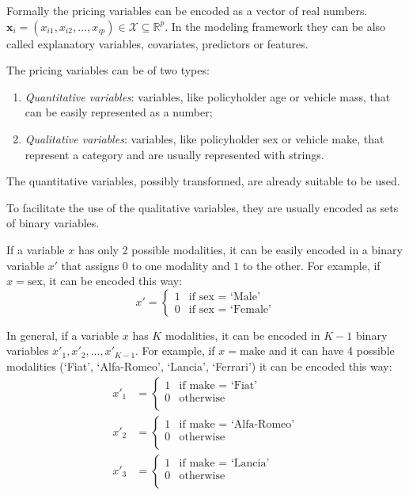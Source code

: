 \documentclass[a4paper, twoside, openright, 12pt]{report}
\providecommand{\tightlist}{%
  \setlength{\itemsep}{0pt}\setlength{\parskip}{0pt}}
\theoremstyle{definition}
\theoremstyle{definition}
\theoremstyle{definition}
\theoremstyle{remark}
\begin{document}
Formally the pricing variables can be encoded as a vector of real numbers. \(\boldsymbol{x}_i=(x_{i1}, x_{i2}, \dots, x_{ip})\in\mathcal{X}\subseteq\mathbb{R}^p\). In the modeling framework they can be also called explanatory variables, covariates, predictors or features.

The pricing variables can be of two types:

\begin{enumerate}
\def\labelenumi{\arabic{enumi}.}
\tightlist
\item
  \emph{Quantitative variables}: variables, like policyholder age or vehicle mass, that can be easily represented as a number;
\item
  \emph{Qualitative variables}: variables, like policyholder sex or vehicle make, that represent a category and are usually represented with strings.
\end{enumerate}

The quantitative variables, possibly transformed, are already suitable to be used.

To facilitate the use of the qualitative variables, they are usually encoded as sets of binary variables.

If a variable \(x\) has only 2 possible modalities, it can be easily encoded in a binary variable \(x'\) that assigns \(0\) to one modality and \(1\) to the other. For example, if \(x = \text{sex}\), it can be encoded this way:
\[
x' = \begin{cases}
1 & \text{if } \text{sex } = \text{ `Male'} \\
0 & \text{if } \text{sex } = \text{ `Female'}
\end{cases}
\]

In general, if a variable \(x\) has \(K\) modalities, it can be encoded in \(K-1\) binary variables \(x'_1, x'_2, \dots, x'_{K-1}\). For example, if \(x = \text{make}\) and it can have 4 possible modalities (`Fiat', `Alfa-Romeo', `Lancia', `Ferrari') it can be encoded this way:
\begin{align*}
x'_1 & = \begin{cases}
1 & \text{if } \text{make } = \text{ `Fiat'} \\
0 & \text{otherwise} \\
\end{cases}
\\
x'_2 & = \begin{cases}
1 & \text{if } \text{make } = \text{ `Alfa-Romeo'} \\
0 & \text{otherwise} \\
\end{cases}
\\
x'_3 & = \begin{cases}
1 & \text{if } \text{make } = \text{ `Lancia'} \\
0 & \text{otherwise} \\
\end{cases}
\\
\end{align*}
\end{document}
